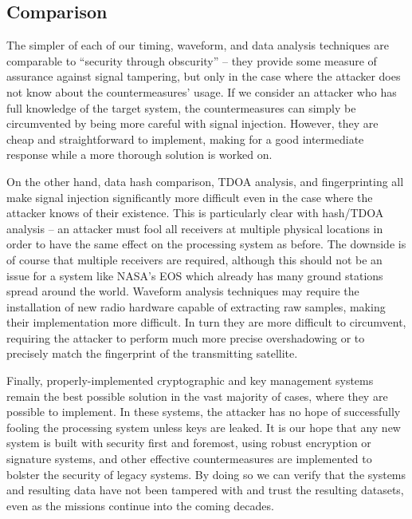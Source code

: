 \subsection{Comparison}

The simpler of each of our timing, waveform, and data analysis techniques are comparable to ``security through obscurity'' -- they provide some measure of assurance against signal tampering, but only in the case where the attacker does not know about the countermeasures' usage.
If we consider an attacker who has full knowledge of the target system, the countermeasures can simply be circumvented by being more careful with signal injection.
However, they are cheap and straightforward to implement, making for a good intermediate response while a more thorough solution is worked on.

On the other hand, data hash comparison, TDOA analysis, and fingerprinting all make signal injection significantly more difficult even in the case where the attacker knows of their existence.
This is particularly clear with hash/TDOA analysis -- an attacker must fool all receivers at multiple physical locations in order to have the same effect on the processing system as before.
The downside is of course that multiple receivers are required, although this should not be an issue for a system like NASA's EOS which already has many ground stations spread around the world.
Waveform analysis techniques may require the installation of new radio hardware capable of extracting raw samples, making their implementation more difficult.
In turn they are more difficult to circumvent, requiring the attacker to perform much more precise overshadowing or to precisely match the fingerprint of the transmitting satellite.

Finally, properly-implemented cryptographic and key management systems remain the best possible solution in the vast majority of cases, where they are possible to implement.
In these systems, the attacker has no hope of successfully fooling the processing system unless keys are leaked.
It is our hope that any new system is built with security first and foremost, using robust encryption or signature systems, and other effective countermeasures are implemented to bolster the security of legacy systems.
By doing so we can verify that the systems and resulting data have not been tampered with and trust the resulting datasets, even as the missions continue into the coming decades.
